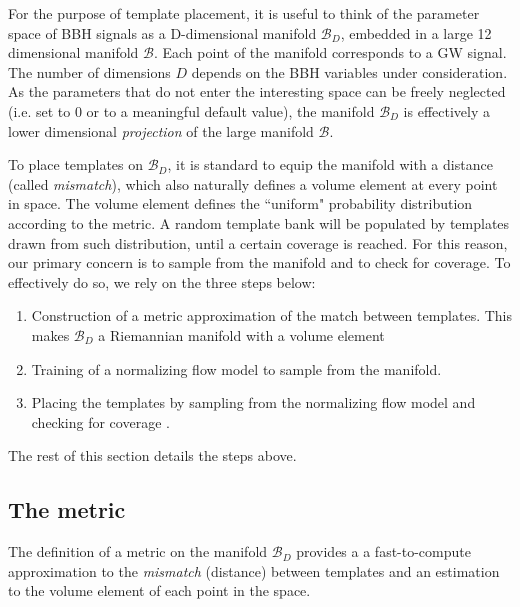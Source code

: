 \documentclass[twocolumn,showpacs,preprintnumbers,nofootinbib,prd,
superscriptaddress,10pt]{revtex4-2}
\begin{document}
For the purpose of template placement, it is useful to think of the parameter space of BBH signals as a D-dimensional manifold $\mathcal{B}_D$, embedded in a large 12 dimensional manifold $\mathcal{B}$. Each point of the manifold corresponds to a GW signal. The number of dimensions $D$ depends on the BBH variables under consideration.
As the parameters that do not enter the interesting space can be freely neglected (i.e. set to $0$ or to a meaningful default value), the manifold $\mathcal{B}_D$ is effectively a lower dimensional {\it projection} of the large manifold $\mathcal{B}$.

To place templates on $\mathcal{B}_D$, it is standard to equip the manifold with a distance (called {\it mismatch}), which also naturally defines a volume element at every point in space. The volume element defines the ``uniform" probability distribution according to the metric.
A random template bank will be populated by templates drawn from such distribution, until a certain coverage is reached. For this reason, our primary concern is to sample from the manifold and to check for coverage. To effectively do so, we rely on the three steps below:
\begin{enumerate}
	\item Construction of a metric approximation of the match between templates. This makes $\mathcal{B}_D$ a Riemannian manifold with a volume element
	\item Training of a normalizing flow model to sample from the manifold. 
	\item Placing the templates by sampling from the normalizing flow model and checking for coverage \cite{Coogan:2022qxs}.
\end{enumerate}
The rest of this section details the steps above.

\subsection{The metric} \label{sec:metric}

The definition of a metric on the manifold $\mathcal{B}_D$ provides a a fast-to-compute approximation to the {\it mismatch} (distance) between templates and an estimation to the volume element of each point in the space.
\end{document}
